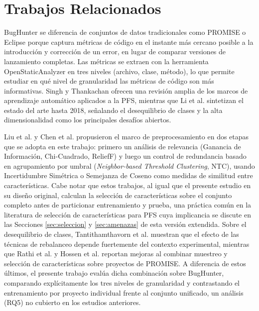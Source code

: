 \documentclass[conference,a4paper]{IEEEtran}
\begin{document}
\section{Trabajos Relacionados}

BugHunter \cite{ferenc2020} se diferencia de conjuntos de datos tradicionales como PROMISE o Eclipse \cite{promise2005} porque captura métricas de código en el instante más cercano posible a la introducción y corrección de un error, en lugar de comparar versiones de lanzamiento completas. Las métricas se extraen con la herramienta OpenStaticAnalyzer \cite{osa2004} en tres niveles (archivo, clase, método), lo que permite estudiar en qué nivel de granularidad las métricas de código son más informativas. Singh y Thankachan \cite{singh2021survey} ofrecen una revisión amplia de los marcos de aprendizaje automático aplicados a la PFS, mientras que Li et al. \cite{li2018} sintetizan el estado del arte hasta 2018, señalando el desequilibrio de clases y la alta dimensionalidad como los principales desafíos abiertos.

Liu et al. \cite{liu2015} y Chen et al. \cite{chen2013} propusieron el marco de preprocesamiento en dos etapas que se adopta en este trabajo: primero un análisis de relevancia (Ganancia de Información, Chi-Cuadrado, ReliefF) y luego un control de redundancia basado en agrupamiento por umbral (\textit{Neighbor-based Threshold Clustering}, NTC), usando Incertidumbre Simétrica \cite{yu2003} o Semejanza de Coseno como medidas de similitud entre características. Cabe notar que estos trabajos, al igual que el presente estudio en su diseño original, calculan la selección de características sobre el conjunto completo antes de particionar entrenamiento y prueba, una práctica común en la literatura de selección de características para PFS cuya implicancia se discute en las Secciones \ref{sec:seleccion} y \ref{sec:amenazas} de esta versión extendida. Sobre el desequilibrio de clases, Tantithamthavorn et al. \cite{tantithamthavorn2020} muestran que el efecto de las técnicas de rebalanceo depende fuertemente del contexto experimental, mientras que Rathi et al. \cite{rathi2023} y Hossen et al. \cite{hossen2020} reportan mejoras al combinar muestreo y selección de características sobre proyectos de PROMISE. A diferencia de estos últimos, el presente trabajo evalúa dicha combinación sobre BugHunter, comparando explícitamente los tres niveles de granularidad y contrastando el entrenamiento por proyecto individual frente al conjunto unificado, un análisis (RQ5) no cubierto en los estudios anteriores.
\end{document}
